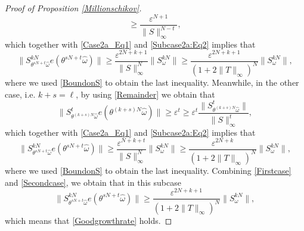 \documentclass[pdflatex,sn-mathphys-num]{sn-jnl}%
\theoremstyle{thmstyleone}%
\theoremstyle{thmstyletwo}%
\theoremstyle{thmstylethree}%
\newcommand{\eps}{\varepsilon}
\numberwithin{equation}{section}
\begin{document}
\begin{proof}[Proof of Proposition \ref{Millionschikov}]
\[\geq\frac{\eps^{N+1}}{\|S\|_{\infty}^{N-t}},
\]
which together with \eqref{Case2a_Eq1} and \eqref{Subcase2a:Eq2} implies that 
\begin{equation}\label{Firstcase}
\|S^{kN}_{\theta^{sN+t}\widehat\omega}e(\theta^{sN+t}\widehat\omega)\|
\geq \frac{\eps^{2N+k+1}}{\|S\|_{\infty}^N}\|S^{kN}_{\omega}\|
\geq 
\frac{\eps^{2N+k+1}}{(1+2\|T\|_{\infty})^N}\|S^{kN}_{\omega}\|,
\end{equation}
where we used \eqref{BoundonS} to obtain the last inequality. Meanwhile, in the other case, i.e. $k+s=\ell$, by using \eqref{Remainder} we obtain that 
\[
\|S^{t}_{\theta^{(k+s)N}\widehat\omega}e(\theta^{(k+s)N}\widehat\omega)\|
\geq 
\eps^t
\geq 
\eps^t\frac{\|S^{t}_{\theta^{(k+s)N}\widehat\omega}\|}{\|S\|_{\infty}^{t}},
\]
which together with \eqref{Case2a_Eq1} and \eqref{Subcase2a:Eq2} implies that 
\begin{equation}\label{Secondcase}
\|S^{kN}_{\theta^{sN+t}\widehat\omega}e(\theta^{sN+t}\widehat\omega)\|
\geq \frac{\eps^{N+k+t}}{\|S\|_{\infty}^N}\|S^{kN}_{\omega}\|
\geq 
\frac{\eps^{2N+k}}{(1+2\|T\|_{\infty})^N}\|S^{kN}_{\omega}\|,
\end{equation}
where we used \eqref{BoundonS} to obtain the last inequality. Combining \eqref{Firstcase} and \eqref{Secondcase}, we obtain that in this subcase 
\[
\|S^{kN}_{\theta^{sN+t}\widehat\omega}e(\theta^{sN+t}\widehat\omega)\|
\geq 
\frac{\eps^{2N+k+1}}{(1+2\|T\|_{\infty})^N}\|S^{kN}_{\omega}\|,
\]
which means that  \eqref{Goodgrowthrate} holds. 


\end{proof}
\end{document}
